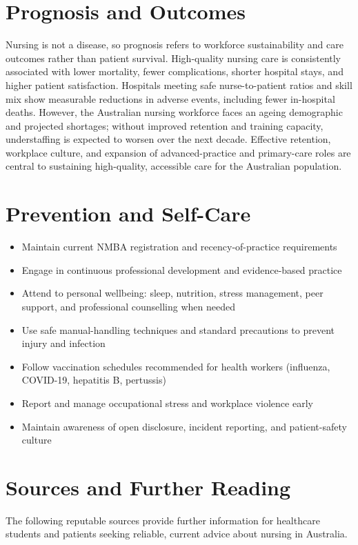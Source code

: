 \section*{Prognosis and Outcomes}
Nursing is not a disease, so prognosis refers to workforce sustainability and care outcomes rather than patient survival. High-quality nursing care is consistently associated with lower mortality, fewer complications, shorter hospital stays, and higher patient satisfaction. Hospitals meeting safe nurse-to-patient ratios and skill mix show measurable reductions in adverse events, including fewer in-hospital deaths. However, the Australian nursing workforce faces an ageing demographic and projected shortages; without improved retention and training capacity, understaffing is expected to worsen over the next decade. Effective retention, workplace culture, and expansion of advanced-practice and primary-care roles are central to sustaining high-quality, accessible care for the Australian population.

\section*{Prevention and Self-Care}
\begin{itemize}
    \item Maintain current NMBA registration and recency-of-practice requirements
    \item Engage in continuous professional development and evidence-based practice
    \item Attend to personal wellbeing: sleep, nutrition, stress management, peer support, and professional counselling when needed
    \item Use safe manual-handling techniques and standard precautions to prevent injury and infection
    \item Follow vaccination schedules recommended for health workers (influenza, COVID-19, hepatitis B, pertussis)
    \item Report and manage occupational stress and workplace violence early
    \item Maintain awareness of open disclosure, incident reporting, and patient-safety culture
\end{itemize}

\section*{Sources and Further Reading}
The following reputable sources provide further information for healthcare students and patients seeking reliable, current advice about nursing in Australia.

